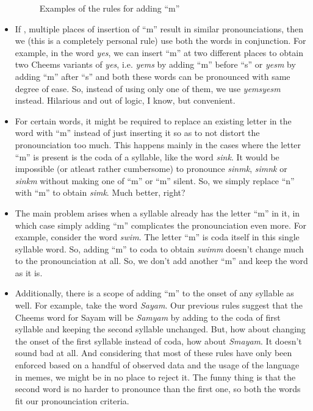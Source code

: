 \def\DevnagVersion{2.17}\documentclass{article}
\begin{document}
\begin{itemize}
\begin{figure}[H]
\begin{subfigure}{0.45\textwidth}
              \end{subfigure}
              \caption{Examples of the rules for adding ``m''}
          \end{figure}

    \item If , multiple places of insertion of ``m'' result in similar pronounciations, then we (this is a completely personal rule) use both the words in conjunction. For example, in the word \textit{yes}, we can insert ``m'' at two different places to obtain two Cheems variants of \textit{yes}, i.e. \textit{yems} by adding ``m'' before ``s'' or \textit{yesm} by adding ``m'' after ``s'' and both these words can be pronounced with same degree of ease. So, instead of using only one of them, we use \textit{yemsyesm} instead. Hilarious and out of logic, I know, but convenient.

    \item For certain words, it might be required to replace an existing letter in the word with ``m'' instead of just inserting it so as to not distort the pronounciation too much. This happens mainly in the cases where the letter ``m'' is present is the coda of a syllable, like the word \textit{sink}. It would be impossible (or atleast rather cumbersome) to pronounce \textit{sinmk}, \textit{simnk} or \textit{sinkm} without making one of ``m'' or ``m'' silent. So, we simply replace ``n'' with ``m'' to obtain \textit{simk}. Much better, right?

    \item The main problem arises when a syllable already has the letter ``m'' in it, in which case simply adding ``m'' complicates the pronounciation even more. For example, consider the word \textit{swim}. The letter ``m'' is coda itself in this single syllable word. So, adding ``m'' to coda to obtain \textit{swimm} doesn't change much to the pronounciation at all. So, we don't add another ``m'' and keep the word as it is.

    \item Additionally, there is a scope of adding ``m'' to the onset of any syllable as well. For example, take the word \textit{Sayam}. Our previous rules suggest that the Cheems word for Sayam will be \textit{Samyam} by adding to the coda of first syllable and keeping the second syllable unchanged. But, how about changing the onset of the first syllable instead of coda, how about \textit{Smayam}. It doesn't sound bad at all. And considering that most of these rules have only been enforced based on a handful of observed data and the usage of the language in memes, we might be in no place to reject it. The funny thing is that the second word is no harder to pronounce than the first one, so both the words fit our pronounciation criteria.


\end{itemize}
\end{document}
